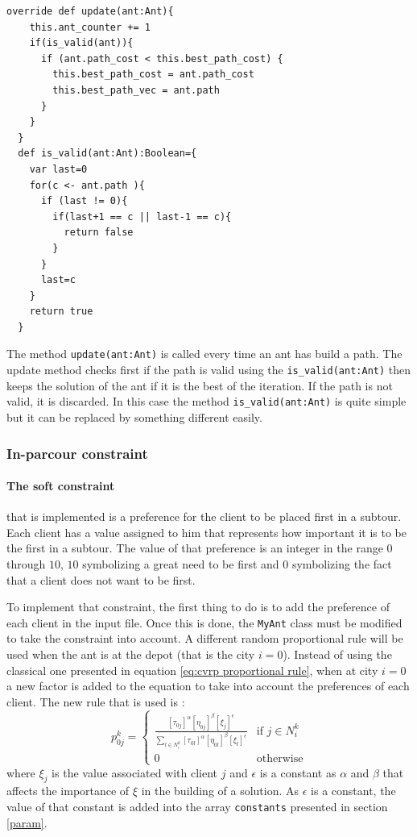 	\begin{lstlisting}[captionpos=b, caption = Method used for the off-path constraints, label= code:offconstraint]
 override def update(ant:Ant){
    this.ant_counter += 1
    if(is_valid(ant)){
      if (ant.path_cost < this.best_path_cost) {
        this.best_path_cost = ant.path_cost
        this.best_path_vec = ant.path
      }
    }
  }  
  def is_valid(ant:Ant):Boolean={
    var last=0
    for(c <- ant.path ){
      if (last != 0){
        if(last+1 == c || last-1 == c){
          return false
        }
      }
      last=c
    }
    return true
  }\end{lstlisting}

The method \texttt{update(ant:Ant)} is called every time an ant has build a path. The update method checks first if the path is valid using the \texttt{is\_valid(ant:Ant)} then keeps the solution of the ant if it is the best of the iteration. If the path is not valid, it is discarded. In this case the method \texttt{is\_valid(ant:Ant)} is quite simple but it can be replaced by something different easily.

\subsubsection{In-parcour constraint}\label{inconstraints}
\paragraph{The soft constraint} that is implemented is a preference for the client to be placed first in a subtour. Each client has a value assigned to him that represents how important it is to be the first in a subtour. The value of that preference is an integer in the range $0$ through $10$, $10$ symbolizing a great need to be first and $0$ symbolizing the fact that a client does not want to be first.

To implement that constraint, the first thing to do is to add the preference of each client in the input file. Once this is done, the \texttt{MyAnt} class must be modified to take the constraint into account. A different random proportional rule will be used when the ant is at the depot (that is the city $i = 0$). Instead of using the classical one presented in equation \ref{eq:cvrp proportional rule}, when at city $i = 0$ a new factor is added to the equation to take into account the preferences of each client. The new rule that is used is :
\begin{equation}
	p_{0j}^k =
	\begin{cases}
		\frac{[\tau_{0j}]^\alpha [\eta_{0j}]^\beta [\xi_{j}]^\epsilon}{\sum_{l\in N_i^k}{[\tau_{0l}]^\alpha [\eta_{0l}]^\beta [\xi_{l}]^\epsilon}} & \text{if } j\in N_i^k\\
		0 & \text{otherwise}
	\end{cases}
\label{eq:modifproportionalrule}
\end{equation}
where $\xi_{j}$ is the value associated with client $j$ and $\epsilon$ is a constant as $\alpha$ and $\beta$ that affects the importance of $\xi$ in the building of a solution. As $\epsilon$ is a constant, the value of that constant is added into the array \texttt{constants} presented in section \ref{param}.

